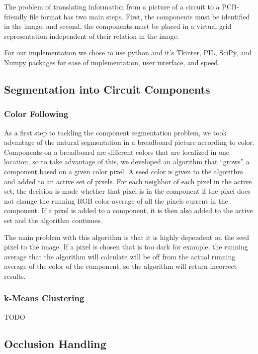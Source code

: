 \documentclass[10pt,twocolumn,letterpaper]{article}
\begin{document}
The problem of translating information from a picture of a circuit to a
PCB-friendly file format has two main steps. First, the components must be
identified in the image, and second, the components must be placed in a virtual
grid representation independent of their relation in the image. 

For our implementation we chose to use python and it's Tkinter, PIL, SciPy, and
Numpy packages for ease of implementation, user interface, and speed. 

\subsection{Segmentation into Circuit Components}

\subsubsection{Color Following}

As a first step to tackling the component segmentation problem, we took
advantage of the natural segmentation in a breadboard picture according to
color. Components on a breadboard are different colors that are localized in
one location, so to take advantage of this, we developed an algorithm that
``grows'' a component based on a given color pixel. A seed color is given to
the algorithm and added to an active set of pixels. For each neighbor of each
pixel in the active set, the decision is made whether that pixel is in the
component if the pixel does not change the running RGB color-average of all the
pixels current in the component. If a pixel is added to a component, it is then
also added to the active set and the algorithm continues.     

The main problem with this algorithm is that it is highly dependent on the seed
pixel to the image. If a pixel is chosen that is too dark for example, the
running average that the algorithm will calculate will be off from the actual
running average of the color of the component, so the algorithm will return
incorrect results.   

\subsubsection{k-Means Clustering}

TODO

\subsection{Occlusion Handling}
\end{document}
